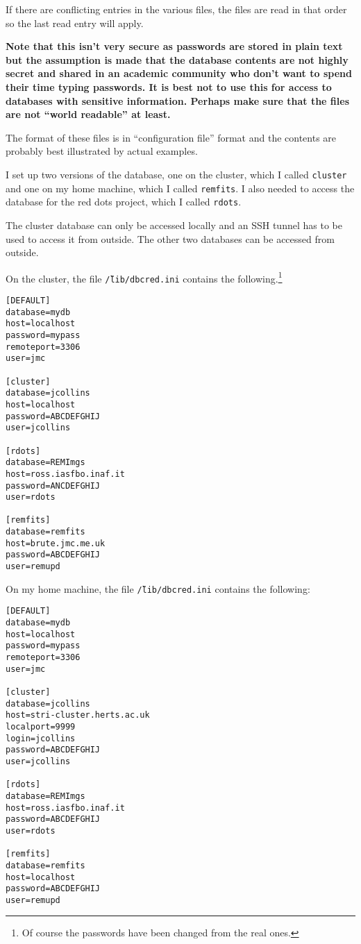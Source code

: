 If there are conflicting entries in the various files, the files are read in
that order so the last read entry will apply.

\textbf{{\bomb} Note that this isn't very secure as passwords are stored in
plain text but the assumption is made that the database contents are not highly secret and
shared in an academic community who don't want to spend their time typing
passwords. It is best not to use this for access to databases with sensitive
information. Perhaps make sure that the files are not ``world readable'' at
least.}

The format of these files is in ``configuration file'' format and the contents
are probably best illustrated by actual examples.

I set up two versions of the database, one on the cluster, which I called
\texttt{cluster} and one on my home machine, which I called \texttt{remfits}. I
also needed to access the database for the red dots project, which I called
\texttt{rdots}.

The cluster database can only be accessed locally and an SSH tunnel has to be
used to access it from outside. The other two databases can be accessed from
outside.

On the cluster, the file \texttt{\~/lib/dbcred.ini} contains the
following.\footnote{Of course the passwords have been changed from the real
ones.}

\begin{verbatim}
[DEFAULT]
database=mydb
host=localhost
password=mypass
remoteport=3306
user=jmc

[cluster]
database=jcollins
host=localhost
password=ABCDEFGHIJ
user=jcollins

[rdots]
database=REMImgs
host=ross.iasfbo.inaf.it
password=ANCDEFGHIJ
user=rdots

[remfits]
database=remfits
host=brute.jmc.me.uk
password=ABCDEFGHIJ
user=remupd
\end{verbatim}

On my home machine, the file \texttt{\~/lib/dbcred.ini} contains the following:

\begin{verbatim}
[DEFAULT]
database=mydb
host=localhost
password=mypass
remoteport=3306
user=jmc

[cluster]
database=jcollins
host=stri-cluster.herts.ac.uk
localport=9999
login=jcollins
password=ABCDEFGHIJ
user=jcollins

[rdots]
database=REMImgs
host=ross.iasfbo.inaf.it
password=ABCDEFGHIJ
user=rdots

[remfits]
database=remfits
host=localhost
password=ABCDEFGHIJ
user=remupd
\end{verbatim}

